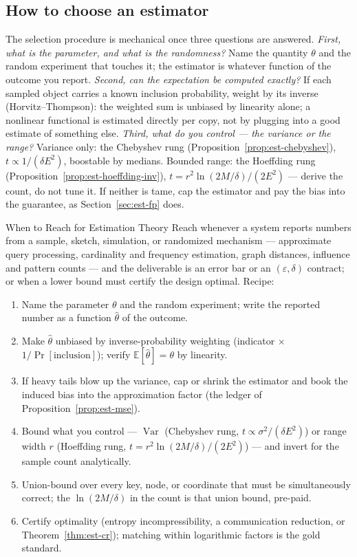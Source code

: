 \subsection{How to choose an estimator}
\label{sec:est-choose}

The selection procedure is mechanical once three questions are answered. \emph{First, what
is the parameter, and what is the randomness?} Name the quantity $\theta$ and the random
experiment that touches it; the estimator is whatever function of the outcome you report.
\emph{Second, can the expectation be computed exactly?} If each sampled object carries a
known inclusion probability, weight by its inverse (Horvitz--Thompson): the weighted sum
is unbiased by linearity alone; a nonlinear functional is estimated directly per copy,
not by plugging into a good estimate of something else. \emph{Third, what do you control
--- the variance or the range?} Variance only: the Chebyshev rung
(Proposition~\ref{prop:est-chebyshev}), $t \propto 1/(\delta E^2)$, boostable by
medians. Bounded range: the Hoeffding rung (Proposition~\ref{prop:est-hoeffding-inv}),
$t = r^2\ln(2M/\delta)/(2E^2)$ --- derive the count, do not tune it. If neither is tame,
cap the estimator and pay the bias into the guarantee, as Section~\ref{sec:est-fp} does.

\begin{reachbox}{When to Reach for Estimation Theory}
Reach whenever a system reports numbers from a sample, sketch, simulation, or randomized
mechanism --- approximate query processing, cardinality and frequency estimation, graph
distances, influence and pattern counts --- and the deliverable is an error bar or an
$(\varepsilon,\delta)$ contract; or when a lower bound must certify the design optimal. Recipe:
\begin{enumerate}
\item Name the parameter $\theta$ and the random experiment; write the reported number as a
  function $\hat\theta$ of the outcome.
\item Make $\hat\theta$ unbiased by inverse-probability weighting (indicator $\times$
  $1/\Pr[\text{inclusion}]$); verify $\mathbb{E}[\hat\theta] = \theta$ by linearity.
\item If heavy tails blow up the variance, cap or shrink the estimator and book the induced
  bias into the approximation factor (the ledger of Proposition~\ref{prop:est-mse}).
\item Bound what you control --- $\operatorname{Var}$ (Chebyshev rung, $t \propto
  \sigma^2/(\delta E^2)$) or range width $r$ (Hoeffding rung, $t =
  r^2\ln(2M/\delta)/(2E^2)$) --- and invert for the sample count analytically.
\item Union-bound over every key, node, or coordinate that must be simultaneously correct;
  the $\ln(2M/\delta)$ in the count is that union bound, pre-paid.
\item Certify optimality (entropy incompressibility, a communication reduction, or
  Theorem~\ref{thm:est-cr}); matching within logarithmic factors is the gold standard.
\end{enumerate}
\end{reachbox}

